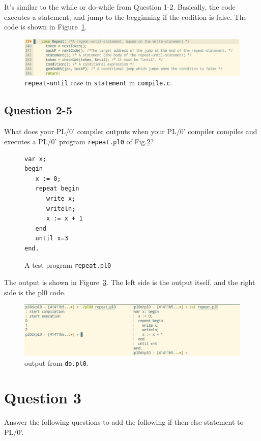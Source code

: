 \documentclass{article}
\begin{document}
\ifreport
It's similar to the while or do-while from Question 1-2. Basically, the code executes a statement, and jump to the begginning if the codition is false. The code is shown in Figure~\ref{fig:q24}. \\
\begin{figure}[h]
  \includegraphics[scale=0.35]{./img/Q2-4.png}
  \centering
  \caption{{\tt repeat-until} case in {\tt statement} in {\tt compile.c}.}
  \label{fig:q24}
\end{figure}
\fi


\subsection*{Question 2-5}
What does your PL/0' compiler outputs when your PL/0' compiler compiles
and executes a PL/0' program {\tt repeat.pl0} of Fig.\ref{fig:repeat-until}?

\begin{figure}[h]
\begin{verbatim}
var x;
begin
   x := 0;
   repeat begin
      write x; 
      writeln;
      x := x + 1
   end
   until x=3
end.
\end{verbatim}
\caption{A test program {\tt repeat.pl0}}\label{fig:repeat-until}
\end{figure}


\ifreport
The output is shown in Figure~\ref{fig:q25}. The left side is the output itself, and the right side is the pl0 code. \\
\begin{figure}[h]
  \includegraphics[scale=0.35]{./img/Q2-5.png}
  \centering
  \caption{output from {\tt do.pl0}.}
  \label{fig:q25}
\end{figure}
\fi


\newpage
\section*{Question 3}
Answer the following questions to add the following if-then-else statement to PL/0'.
\end{document}
